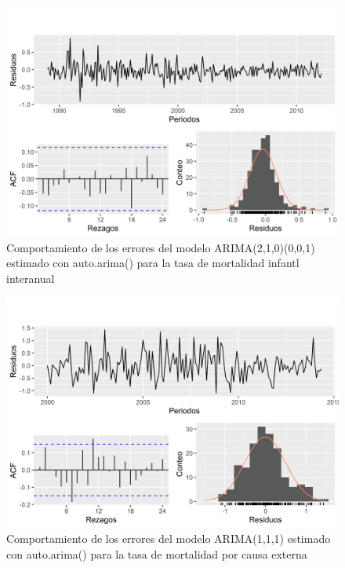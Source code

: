 \documentclass[
]{article}
\begin{document}
\begin{figure}[H]
\includegraphics[width=1\linewidth,height=1\textheight]{Tesis_files/figure-latex/errores_reales_autoarima1-1} \caption{Comportamiento de los errores del modelo ARIMA(2,1,0)(0,0,1) estimado con auto.arima() para la tasa de mortalidad infantl interanual}\label{fig:errores_reales_autoarima1}
\end{figure}

\begin{figure}[H]
\includegraphics[width=1\linewidth,height=1\textheight]{Tesis_files/figure-latex/errores_reales_autoarima2-1} \caption{Comportamiento de los errores del modelo ARIMA(1,1,1) estimado con auto.arima() para la tasa de mortalidad por causa externa}\label{fig:errores_reales_autoarima2}
\end{figure}
\end{document}
